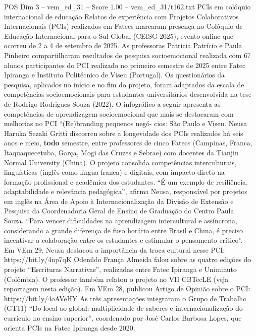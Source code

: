 \begin{textsample}{POS Dim 3 – vem\_ed\_31 – Score 1.00 – vem\_ed\_31/t162.txt}  \label{ex:f3_pos_047}
PCIs em colóquio internacional de educação Relatos de experiência com Projetos Colaborativos Internacionais (PCIs) realizados em Fatecs marcaram presença no Colóquio de Educação Internacional para o Sul Global (CEISG 2025), evento online que ocorreu de 2 a 4 de setembro de 2025.
As professoras Patrícia Patrício e Paula Pinheiro compartilharam resultados de pesquisa socioemocional realizada com 67 alunos participantes do PCI realizado no primeiro semestre de 2025 entre Fatec Ipiranga e Instituto Politécnico de Viseu (Portugal).
Os questionários da pesquisa, aplicados no início e no fim do projeto, foram adaptados da escala de competências socioemocionais para estudantes universitários desenvolvida na tese de Rodrigo Rodrigues Souza (2022).
O infográfico a seguir apresenta as competências de aprendizagem socioemocional que mais se destacaram com melhorias no PCI “(Re)branding pequenos negó- cios: São Paulo e Viseu.
Neusa Haruka Sezaki Gritti discorreu sobre a longevidade dos PCIs realizados há seis anos e meio, \textbf{todo} semestre, entre professores de cinco Fatecs (Campinas, Franca, Itaquaquecetuba, Garça, Mogi das Cruzes e Sebrae) com docentes da Tianjin Normal University (China).
O projeto consolida competências interculturais, linguísticas (inglês como língua franca) e digitais, com impacto direto na formação profissional e acadêmica dos estudantes. “É um exemplo de resiliência, adaptabilidade e relevância pedagógica”, afirma Neusa, responsável por projetos em inglês na Área de Apoio à Internacionalização da Divisão de Extensão e Pesquisa da Coordenadoria Geral de Ensino de Graduação do Centro Paula Souza. “Para vencer dificuldades na aprendizagem intercultural e assíncrona, considerando a grande diferença de fuso horário entre Brasil e China, é preciso incentivar a colaboração entre os estudantes e estimular o pensamento crítico”.
Em VEm 29, Neusa destacou a importância da troca cultural nesse PCI: https://bit.ly/4np7qK Odenildo França Almeida falou sobre as quatro edições do projeto “Escrituras Narrativas”, realizadas entre Fatec Ipiranga e Uniminuto (Colômbia).
O professor também relatou o projeto no VII CBTecLE (veja reportagem nesta edição).
Em VEm 28, publicou Artigo de Opinião sobre o PCI: https://bit.ly/4oAVeHY As três apresentações integraram o Grupo de Trabalho (GT11) “Do local ao global: multiplicidade de saberes e internacionalização do currículo no ensino superior”, coordenado por José Carlos Barbosa Lopes, que orienta PCIs na Fatec Ipiranga desde 2020.

\end{textsample}
